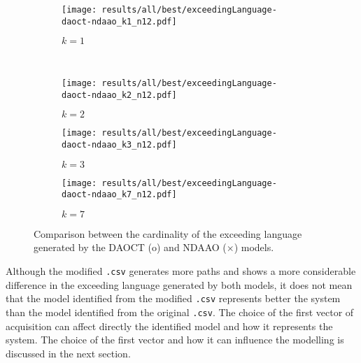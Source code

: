 \begin{figure}[H]
  \begin{subfigure}[H]{0.5\textwidth}
    \centering
    \texttt{[image: results/all/best/exceedingLanguage-daoct-ndaao\_k1\_n12.pdf]}
    \caption{$k=1$}
    \label{fig:daoctNdaaoBestkone}
  \end{subfigure}
  ~
  \begin{subfigure}[h]{0.5\textwidth}
    \centering
    \texttt{[image: results/all/best/exceedingLanguage-daoct-ndaao\_k2\_n12.pdf]}
    \caption{$k=2$}
    \label{fig:daoctNdaaoBestktwo}
  \end{subfigure}
  \begin{subfigure}[h]{0.5\textwidth}
    \centering
    \texttt{[image: results/all/best/exceedingLanguage-daoct-ndaao\_k3\_n12.pdf]}
    \caption{$k=3$}
    \label{fig:daoctNdaaoBestkthree}
  \end{subfigure}
  \begin{subfigure}[h]{0.5\textwidth}
    \centering
    \texttt{[image: results/all/best/exceedingLanguage-daoct-ndaao\_k7\_n12.pdf]}
    \caption{$k=7$}
    \label{fig:daoctNdaaoBestkseven}
  \end{subfigure}
  \caption[Comparison between the cardinality of the exceeding language generated by the DAOCT and
NDAAO.]{Comparison between the cardinality of the exceeding language generated by the DAOCT (o) and
NDAAO ($\times$) models.}
\end{figure}
Although the modified \verb|.csv| generates more paths and shows a more
considerable difference in the exceeding language generated by both models, it
does not mean that the model identified from the modified \verb|.csv| represents better the
system than the model identified from the original \verb|.csv|.
The choice of the first vector of acquisition can affect directly the identified
model and how it represents the system. The choice of the first vector and how
it can influence the modelling is discussed in the
next section.
\newpage
